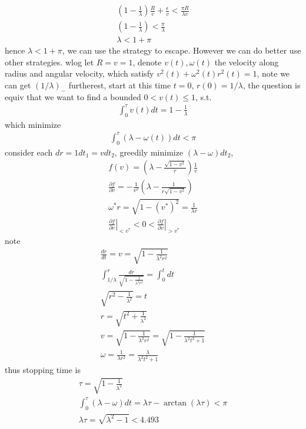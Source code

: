\documentclass[paper=a4, fontsize=11pt]{scrartcl} %
\numberwithin{equation}{section} %
\numberwithin{figure}{section} %
\numberwithin{table}{section} %
\begin{document}
\begin{itemize}
\begin{align}
		(1-\frac{1}{\lambda})\frac{R}{v} + \frac{\epsilon}{v}< \frac{\pi R}{\lambda v}\\
			(1-\frac{1}{\lambda}) < \frac{\pi}{\lambda}\\
			\lambda < 1+\pi
	\end{align}
	hence $\lambda<1+\pi$, we can use the strategy to escape. However we can do better use other strategies. wlog let $R=v=1$, denote $v(t),\omega(t)$ the velocity along radius and angular velocity, which satisfy $v^2(t) + \omega^2(t)r^2(t) = 1$, note we can get $(1/\lambda)_-$ furtherest, start at this time $t=0$, $r(0)=1/\lambda$, the question is equiv that we want to find a bounded $0<v(t)\leq 1$, s.t.
	\begin{align}
		\int_0^\tau v(t)dt = 1 - \frac{1}{\lambda}
	\end{align}
	which minimize
	\begin{align}
		\int_0^\tau (\lambda - \omega(t))dt < \pi
	\end{align}
	consider each $dr=1dt_1=vdt_2$, greedily minimize $(\lambda-\omega)dt_2$,
	\begin{align}
		f(v) = (\lambda - \frac{\sqrt{1-v^2}}{r})\frac{1}{v}\\
		\frac{\partial f}{\partial v} = -\frac{1}{v^2}(\lambda - \frac{1}{r\sqrt{1-v^2}})\\
		\omega^* r= \sqrt{1- (v^*)^2} =\frac{1}{\lambda r}\\
		\left.\frac{\partial f}{\partial v}\right|_{<v^*}<0<\left.\frac{\partial f}{\partial v}\right|_{>v^*}
	\end{align}
	note 
	\begin{align}
		\frac{dr}{dt} = v = \sqrt{1 - \frac{1}{\lambda^2r^2}}\\
		\int_{1/\lambda}^r \frac{dr}{\sqrt{1 - \frac{1}{\lambda^2r^2}}} =\int_0^t dt\\
		\sqrt{r^2 - \frac{1}{\lambda^2}} = t\\
		r = \sqrt{t^2 + \frac{1}{\lambda^2}}\\
		v = \sqrt{1 - \frac{1}{\lambda^2r^2}} = \sqrt{1 - \frac{1}{\lambda^2t^2+1}}\\
		\omega = \frac{1}{\lambda r^2} = \frac{\lambda}{\lambda^2t^2+1}
	\end{align}
	thus stopping time is
	\begin{align}
		\tau = \sqrt{1 - \frac{1}{\lambda^2}}\\
		\int_0^\tau (\lambda - \omega) dt = \lambda \tau - \arctan(\lambda\tau)<\pi\\
		\lambda \tau = \sqrt{\lambda^2-1}< 4.493\\

\end{align}
\end{itemize}
\end{document}
